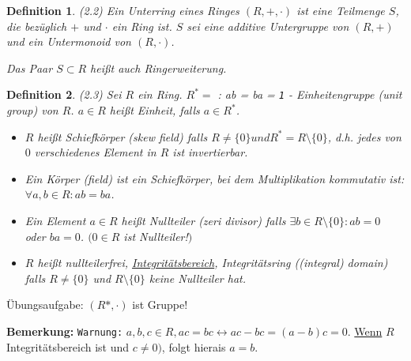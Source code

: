 \documentclass[10pt,a4paper]{article}
\newtheorem{defi}{Definition}
\begin{document}
\begin{defi}(2.2)
Ein \emph{Unterring} eines Ringes $(R, +, \cdot)$ ist eine Teilmenge $S$, die bezüglich $+$ und $\cdot$ ein Ring ist. $S$ sei eine additive Untergruppe von $(R,+)$ und ein Untermonoid von $(R,\cdot)$.

Das Paar $S \subset R$ heißt auch \emph{Ringerweiterung}.
\end{defi}

\begin{defi}(2.3)
Sei $R$ ein Ring. $R^* = $ : ab = ba = \texttt{1} - Einheitengruppe (\glqq unit group\grqq) von $R$. $a \in R$ heißt \emph{Einheit}, falls $a \in R^*$.
\begin{itemize}
\item $R$ heißt Schiefkörper (\glqq skew field\grqq) falls $R \neq \{0\} und R^* = R \setminus \{0\}$, d.h. jedes von $0$ verschiedenes Element in $R$ ist invertierbar.

\item Ein \emph{Körper} (\glqq field\grqq) ist ein Schiefkörper, bei dem Multiplikation kommutativ ist: $\forall a,b \in R: ab = ba$.

\item Ein Element $a \in R$ heißt \emph{Nullteiler} (\glqq zeri divisor\grqq) falls $\exists b \in R \setminus \{0\} : ab = 0$ oder $ba = 0$. $(0 \in R$ ist Nullteiler!$)$

\item $R$ heißt \emph{nullteilerfrei}, \underline{\emph{Integritätsbereich}}, \emph{Integritätsring} (\glqq (integral) domain\grqq ) falls $R \neq \{0\}$ und $R \setminus \{0\}$ keine Nullteiler hat.
\end{itemize}
\end{defi}

Übungsaufgabe: $(R*, \cdot)$ ist Gruppe!

\textbf{Bemerkung:} \texttt{Warnung:} $a,b,c \in R, ac = bc \leftrightarrow ac - bc = (a-b)c = 0$. \underline{Wenn} $R$ Integritätsbereich ist und $c \neq 0)$, folgt hierais $a = b$.\bigskip
\end{document}
